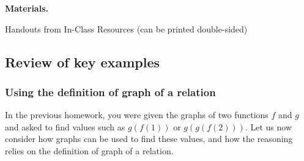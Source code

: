 \documentclass[11pt]{article}
\newenvironment{bignote}[1][Instructor note]%
	{\begin{mdframed}\raggedright{\bf #1.~}}
	{\end{mdframed}}
\theoremstyle{definition}
\begin{document}
\newpage
\begin{bignote}[Materials]
\begin{itemize*}
\item Handouts from In-Class Resources (can be printed double-sided)
\end{itemize*}
\end{bignote}

\vspace*{-12pt}
\subsection{Review of key examples}



\vspace*{-4pt}
\subsubsection{Using the definition of graph of a relation}
In the previous homework, you were given the graphs of two functions $f$ and $g$ and asked to find values such as $g(f(1))$ or $g(g(f(2)))$.  Let us now consider how graphs can be used to find these values, and how the reasoning relies on the definition of graph of a relation.
\end{document}
